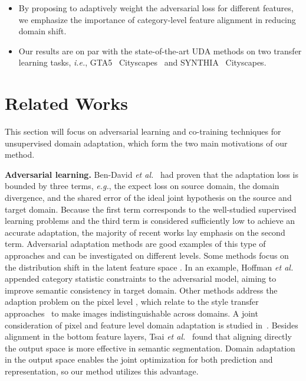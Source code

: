 \documentclass[10pt,twocolumn,letterpaper]{article}
\begin{document}
\begin{itemize}
\item By proposing to adaptively weight the adversarial loss for different features, we emphasize the importance of category-level feature alignment in reducing domain shift. 
\item Our results are on par with the state-of-the-art UDA methods on two transfer learning tasks, \emph{i.e.}, GTA5~\cite{richter2016gta5}  Cityscapes~\cite{cordts2016cityscapes} and SYNTHIA~\cite{ros2016synthia}  Cityscapes.
\end{itemize} 


\section{Related Works}
This section will focus on adversarial learning and co-training techniques for unsupervised domain adaptation, which form the two main motivations of our method.

\textbf{Adversarial learning.}
Ben-David \emph{et al.}~\cite{ben2010theory} had proven that the adaptation loss is bounded by three terms, \emph{e.g.}, the expect loss on source domain, the domain divergence, and the shared error of the ideal joint hypothesis on the source and target domain. Because the first term corresponds to the well-studied supervised learning problems and the third term is considered sufficiently low to achieve an accurate adaptation, the majority of recent works lay emphasis on the second term. Adversarial adaptation methods are good examples of this type of approaches and can be investigated on different levels. Some methods focus on the distribution shift in the latent feature space \cite{solomon2015WGAN,hoffman2016fcns,liu2016coupled,kim2017relations,tzeng2017adversarial,sankaranarayanan2017unsupervised}. In an example, Hoffman \emph{et al.}~\cite{hoffman2016fcns} appended category statistic constraints to the adversarial model, aiming to improve semantic consistency in target domain. Other methods address the adaption problem on the pixel level \cite{li2018Grad-GAN,bousmalis2017pixelDA}, which relate to the style transfer approaches~\cite{zhu2017cycle,choi2017stargan} to make images indistinguishable across domains. A joint consideration of pixel and feature level domain adaptation is studied in~\cite{hoffman2017cycada}. Besides alignment in the bottom feature layers, Tsai \emph{et al.}~\cite{tsai2018OutputSpace} found that aligning directly the output space is more effective in semantic segmentation. Domain adaptation in the output space enables the joint optimization for both prediction and representation, so our method utilizes this advantage. 
\end{document}
